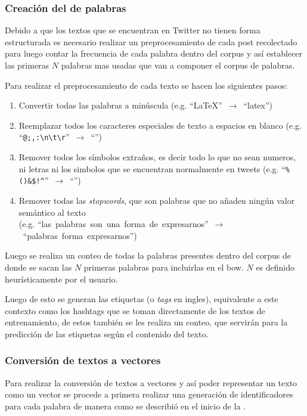 \subsubsection{Creación del  de palabras}
Debido a que los textos que se encuentran en Twitter no tienen forma estructurada es necesario realizar un preprocesamiento de cada post recolectado para luego contar la frecuencia de cada palabra dentro del \gls{corpus} y así establecer las primeras $N$ palabras mas usadas que van a componer el \gls{corpus} de palabras.

Para realizar el preprocesamiento de cada texto se hacen los siguientes pasos:
\begin{enumerate}
\item Convertir todas las palabras a minúscula (e.g. \mbox{``LaTeX'' $\rightarrow$ ``latex''})
\item Reemplazar todos los caracteres especiales de texto a espacios en blanco (e.g. \mbox{``\texttt{@;,:\textbackslash n\textbackslash t\textbackslash r}'' $\rightarrow$ ``\textvisiblespace \textvisiblespace \textvisiblespace \textvisiblespace \textvisiblespace \textvisiblespace \textvisiblespace''})
\item Remover todos los símbolos extraños, es decir todo lo que no sean numeros, ni letras ni los simbolos que se encuentran normalmente en tweets (e.g. \mbox{``\texttt{\%()\*\&\$!\^}'' $\rightarrow$ ``''})
\item Remover todas las \emph{stopwords}, que son palabras que no añaden ningún valor semántico al texto \\ (e.g. \mbox{``las palabras son una forma de expresarnos'' $\rightarrow$ ``palabras forma expresarnos''})
\end{enumerate}

Luego se realiza un conteo de todas la palabras presentes dentro del \gls{corpus} de donde se sacan las $N$ primeras palabras para incluirlas en el \gls{bow}. $N$ es definido heurísticamente por el usuario.

Luego de esto se generan las etiquetas (o \emph{tags} en ingles), equivalente a este contexto como los hashtags que se toman directamente de los textos de entrenamiento, de estos también se les realiza un conteo, que servirán para la predicción de las etiquetas según el contenido del texto.

\subsubsection{Conversión de textos a vectores}
Para realizar la conversión de textos a vectores y así poder representar un texto como un vector se procede a primera realizar una generación de identificadores para cada palabra de manera como se describió en el inicio de la .

